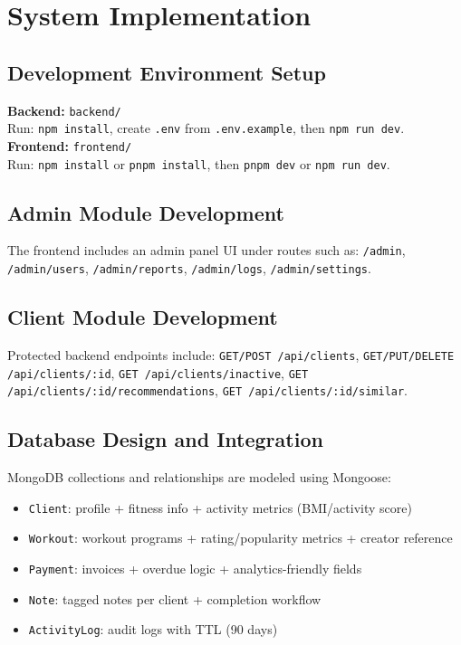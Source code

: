 \documentclass[12pt,a4paper]{report}
\begin{document}
\section{System Implementation}
\subsection{Development Environment Setup}
\textbf{Backend:} \texttt{backend/} \\
Run: \texttt{npm install}, create \texttt{.env} from \texttt{.env.example}, then \texttt{npm run dev}. \\
\textbf{Frontend:} \texttt{frontend/} \\
Run: \texttt{npm install} or \texttt{pnpm install}, then \texttt{pnpm dev} or \texttt{npm run dev}.

\subsection{Admin Module Development}
The frontend includes an admin panel UI under routes such as: \texttt{/admin}, \texttt{/admin/users}, \texttt{/admin/reports}, \texttt{/admin/logs}, \texttt{/admin/settings}.

\subsection{Client Module Development}
Protected backend endpoints include: \texttt{GET/POST /api/clients}, \texttt{GET/PUT/DELETE /api/clients/:id}, \texttt{GET /api/clients/inactive}, \texttt{GET /api/clients/:id/recommendations}, \texttt{GET /api/clients/:id/similar}.

\subsection{Database Design and Integration}
MongoDB collections and relationships are modeled using Mongoose:
\begin{itemize}[leftmargin=*]
  \item \texttt{Client}: profile + fitness info + activity metrics (BMI/activity score)
  \item \texttt{Workout}: workout programs + rating/popularity metrics + creator reference
  \item \texttt{Payment}: invoices + overdue logic + analytics-friendly fields
  \item \texttt{Note}: tagged notes per client + completion workflow
  \item \texttt{ActivityLog}: audit logs with TTL (90 days)
\end{itemize}
\end{document}
